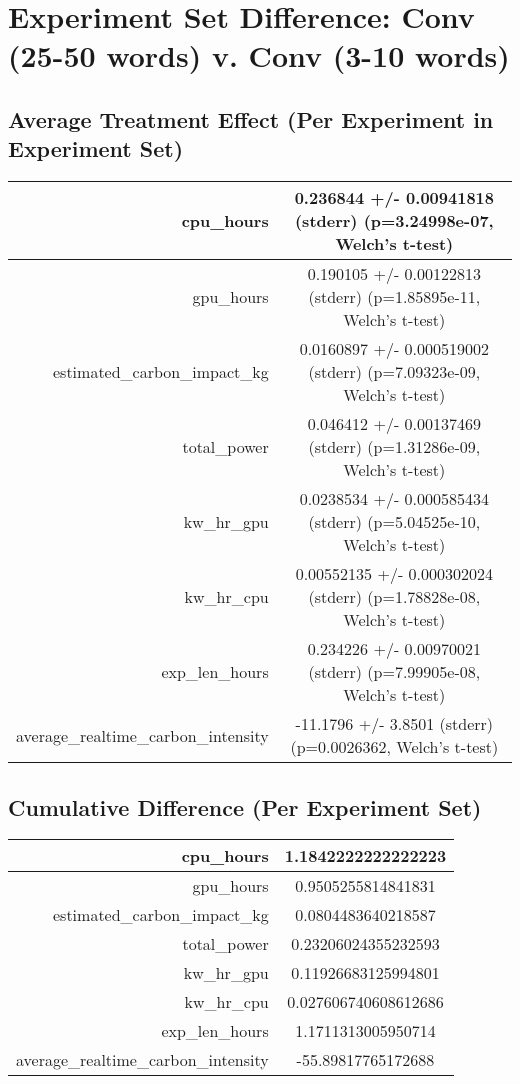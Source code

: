 \documentclass{article}%
\begin{document}
%
\normalsize%
\section{Experiment Set Difference: Conv (25{-}50 words) v. Conv (3{-}10 words)}%
\label{sec:Experiment Set Difference Conv (25{-}50 words) v. Conv (3{-}10 words)}%
\subsection{Average Treatment Effect (Per Experiment in Experiment Set)}%
\label{subsec:Average Treatment Effect (Per Experiment in Experiment Set)}%
\begin{tabular}{|r|c|}%
\hline%
cpu\_hours&0.236844 +/{-} 0.00941818 (stderr) (p=3.24998e{-}07, Welch's t{-}test)\\%
\hline%
gpu\_hours&0.190105 +/{-} 0.00122813 (stderr) (p=1.85895e{-}11, Welch's t{-}test)\\%
\hline%
estimated\_carbon\_impact\_kg&0.0160897 +/{-} 0.000519002 (stderr) (p=7.09323e{-}09, Welch's t{-}test)\\%
\hline%
total\_power&0.046412 +/{-} 0.00137469 (stderr) (p=1.31286e{-}09, Welch's t{-}test)\\%
\hline%
kw\_hr\_gpu&0.0238534 +/{-} 0.000585434 (stderr) (p=5.04525e{-}10, Welch's t{-}test)\\%
\hline%
kw\_hr\_cpu&0.00552135 +/{-} 0.000302024 (stderr) (p=1.78828e{-}08, Welch's t{-}test)\\%
\hline%
exp\_len\_hours&0.234226 +/{-} 0.00970021 (stderr) (p=7.99905e{-}08, Welch's t{-}test)\\%
\hline%
average\_realtime\_carbon\_intensity&{-}11.1796 +/{-} 3.8501 (stderr) (p=0.0026362, Welch's t{-}test)\\%
\hline%
\end{tabular}

%
\subsection{Cumulative Difference (Per Experiment Set)}%
\label{subsec:Cumulative Difference (Per Experiment Set)}%
\begin{tabular}{|r|c|}%
\hline%
cpu\_hours&1.1842222222222223\\%
\hline%
gpu\_hours&0.9505255814841831\\%
\hline%
estimated\_carbon\_impact\_kg&0.0804483640218587\\%
\hline%
total\_power&0.23206024355232593\\%
\hline%
kw\_hr\_gpu&0.11926683125994801\\%
\hline%
kw\_hr\_cpu&0.027606740608612686\\%
\hline%
exp\_len\_hours&1.1711313005950714\\%
\hline%
average\_realtime\_carbon\_intensity&{-}55.89817765172688\\%
\hline%
\end{tabular}

%
\end{document}
